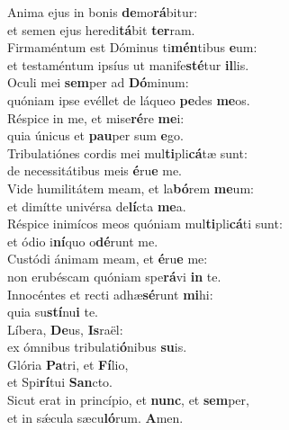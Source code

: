 \evenverse Anima ejus in bonis \textbf{de}mo\textbf{rá}bitur:~\*\\
\evenverse et semen ejus heredi\textbf{tá}bit \textbf{ter}ram.\\
\oddverse Firmaméntum est Dóminus ti\textbf{mén}tibus \textbf{e}um:~\*\\
\oddverse et testaméntum ipsíus ut manife\textbf{sté}tur \textbf{il}lis.\\
\evenverse Oculi mei \textbf{sem}per ad \textbf{Dó}minum:~\*\\
\evenverse quóniam ipse evéllet de láqueo \textbf{pe}des \textbf{me}os.\\
\oddverse Réspice in me, et mise\textbf{ré}re \textbf{me}i:~\*\\
\oddverse quia únicus et \textbf{pau}per sum \textbf{e}go.\\
\evenverse Tribulatiónes cordis mei mul\textbf{ti}pli\textbf{cá}tæ sunt:~\*\\
\evenverse de necessitátibus meis \textbf{é}ru\textbf{e} me.\\
\oddverse Vide humilitátem meam, et la\textbf{bó}rem \textbf{me}um:~\*\\
\oddverse et dimítte univérsa de\textbf{lí}cta \textbf{me}a.\\
\evenverse Réspice inimícos meos quóniam mul\textbf{ti}pli\textbf{cá}ti sunt:~\*\\
\evenverse et ódio i\textbf{ní}quo o\textbf{dé}runt me.\\
\oddverse Custódi ánimam meam, et \textbf{é}ru\textbf{e} me:~\*\\
\oddverse non erubéscam quóniam spe\textbf{rá}vi \textbf{in} te.\\
\evenverse Innocéntes et recti adhæ\textbf{sé}runt \textbf{mi}hi:~\*\\
\evenverse quia su\textbf{stí}nu\textbf{i} te.\\
\oddverse Líbera, \textbf{De}us, \textbf{Is}raël:~\*\\
\oddverse ex ómnibus tribulati\textbf{ó}nibus \textbf{su}is.\\
\evenverse Glória \textbf{Pa}tri, et \textbf{Fí}lio,~\*\\
\evenverse et Spi\textbf{rí}tui \textbf{San}cto.\\
\oddverse Sicut erat in princípio, et \textbf{nunc}, et \textbf{sem}per,~\*\\
\oddverse et in sǽcula sæcu\textbf{ló}rum. \textbf{A}men.\\
